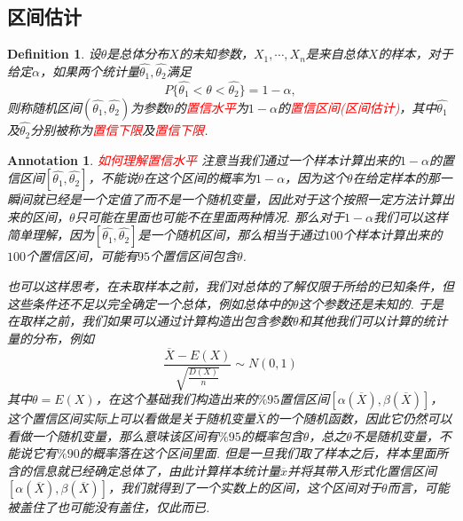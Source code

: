 \documentclass{article}
\newtheorem{definition}[theorem]{Definition}
\newtheorem{annotation}[theorem]{Annotation}
\newcommand{\redt}[1]{\textcolor{red}{#1}}
\begin{document}
\subsection{区间估计}

\begin{definition}
\rm 设$\theta$是总体分布$X$的未知参数，$X_1,\cdots,X_n$是来自总体$X$的样本，对于给定$\alpha$，如果两个统计量$\widehat{\theta_1},\widehat{\theta_2}$满足
$$
P\{\widehat{\theta_1} < \theta < \widehat{\theta_2}\} = 1-\alpha,
$$
则称随机区间$(\widehat{\theta_1},\widehat{\theta_2})$为参数$\theta$的\redt{置信水平}为$1-\alpha$的\redt{置信区间(区间估计)}，其中$\widehat{\theta_1}$及$\widehat{\theta_2}$分别被称为\redt{置信下限}及\redt{置信下限}. 
\end{definition}

\begin{annotation}
\rm \redt{如何理解置信水平} 注意当我们通过一个样本计算出来的$1-\alpha$的置信区间$[\widehat{\theta_1},\widehat{\theta_2}]$，不能说$\theta$在这个区间的概率为$1-\alpha$，因为这个$\theta$在给定样本的那一瞬间就已经是一个定值了而不是一个随机变量，因此对于这个按照一定方法计算出来的区间，$\theta$只可能在里面也可能不在里面两种情况. 那么对于$1-\alpha$我们可以这样简单理解，因为$[\widehat{\theta_1},\widehat{\theta_2}]$是一个随机区间，那么相当于通过$100$个样本计算出来的$100$个置信区间，可能有$95$个置信区间包含$\theta$. 

也可以这样思考，在未取样本之前，我们对总体的了解仅限于所给的已知条件，但这些条件还不足以完全确定一个总体，例如总体中的$\theta$这个参数还是未知的. 于是在取样之前，我们如果可以通过计算构造出包含参数$\theta$和其他我们可以计算的统计量的分布，例如
$$
\frac{\overline{X}-E(X)}{\sqrt{\frac{D(X)}{n}}} \sim N(0,1)
$$
其中$\theta = E(X)$，在这个基础我们构造出来的$\%95$置信区间$[\alpha(\overline{X}),\beta(\overline{X})]$，这个置信区间实际上可以看做是关于随机变量$\overline{X}$的一个随机函数，因此它仍然可以看做一个随机变量，那么意味该区间有$\%95$的概率包含$\theta$，总之$\theta$不是随机变量，不能说它有$\%90$的概率落在这个区间里面. 但是一旦我们取了样本之后，样本里面所含的信息就已经确定总体了，由此计算样本统计量$\overline{x}$并将其带入形式化置信区间$[\alpha(\overline{X}),\beta(\overline{X})]$，我们就得到了一个实数上的区间，这个区间对于$\theta$而言，可能被盖住了也可能没有盖住，仅此而已. 
\end{annotation}
\end{document}
